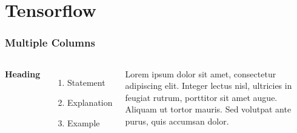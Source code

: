\documentclass{beamer}
\begin{document}
\section{Tensorflow }
\begin{frame}

\end{frame}







\begin{frame}
  \frametitle{Multiple Columns}
  \begin{columns}[c] %

    \textbf{Heading}
    \begin{enumerate}
    \item Statement
    \item Explanation
    \item Example
    \end{enumerate}

    Lorem ipsum dolor sit amet, consectetur adipiscing elit. Integer lectus nisl, ultricies in feugiat rutrum, porttitor sit amet augue. Aliquam ut tortor mauris. Sed volutpat ante purus, quis accumsan dolor.

  \end{columns}
\end{frame}
\end{document}
